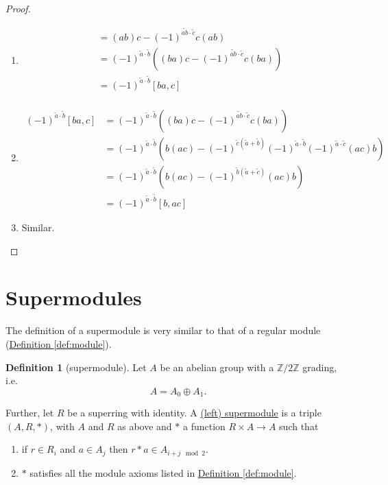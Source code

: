 \documentclass[a4paper,10pt]{scrreprt}
\newcommand{\Z}{\mathbb{Z}}
\newcommand{\defn}[1]{\ul{#1}}
\theoremstyle{definition}
\newtheorem{definition}{Definition}[section]
\theoremstyle{plain}
\theoremstyle{remark}
\begin{document}
\begin{proof}
\begin{itemize}
\begin{enumerate}[label= Equality \arabic*:]
        \item 
          \begin{align*}
            [ab,c] &= (ab)c - (-1)^{\widetilde{ab}\cdot \tilde{c}} c(ab) \\
            &= (-1)^{\tilde{a}\cdot \tilde{b}}\left((ba)c  -  (-1)^{\widetilde{ab}\cdot \tilde{c}}c(ba) \right)\\
            &= (-1)^{\tilde{a}\cdot \tilde{b}}[ba,c] \\
          \end{align*}
        \item
          \begin{align*}
            (-1)^{\tilde{a}\cdot \tilde{b}}[ba,c] &= (-1)^{\tilde{a}\cdot \tilde{b}}\left((ba)c  -  (-1)^{\tilde{ab}\cdot \tilde{c}}c(ba) \right) \\
            &= (-1)^{\tilde{a}\cdot \tilde{b}} \left( b(ac) - (-1)^{\tilde{c}(\tilde{a} + \tilde{b})} (-1)^{\tilde{a}\cdot \tilde{b}} (-1)^{\tilde{a}\cdot \tilde{c}} (ac)b\right) \\
            &= (-1)^{\tilde{a}\cdot \tilde{b}}\left( b(ac) - (-1)^{\tilde{b}(\tilde{a}+\tilde{c})} (ac)b \right) \\
            &= (-1)^{\tilde{a}\cdot \tilde{b}} [b,ac]
          \end{align*}

        \item Similar.
      \end{enumerate}
  \end{itemize}
\end{proof}

\section{Supermodules}
The definition of a supermodule is very similar to that of a regular module (\hyperref[def:module]{Definition \ref*{def:module}}).
\begin{definition}[supermodule]
  \label{def:supermodule}
  Let $A$ be an abelian group with a $\Z/2\Z$ grading, i.e.
  \begin{equation*}
    A = A_{0}\oplus A_{1}.
  \end{equation*}

  Further, let $R$ be a superring with identity. A \defn{(left) supermodule} is a triple $(A,R,* )$, with $A$ and $R$ as above and $*$ a function $R \times A \to A$ such that
  \begin{enumerate}
    \item if $r \in R_{i}$ and $a \in A_{j}$ then $r*a \in A_{i+j \mod{2}}$.
    \item $*$ satisfies all the module axioms listed in \hyperref[def:module]{Definition \ref*{def:module}}.
  \end{enumerate}
\end{definition}
\end{document}
